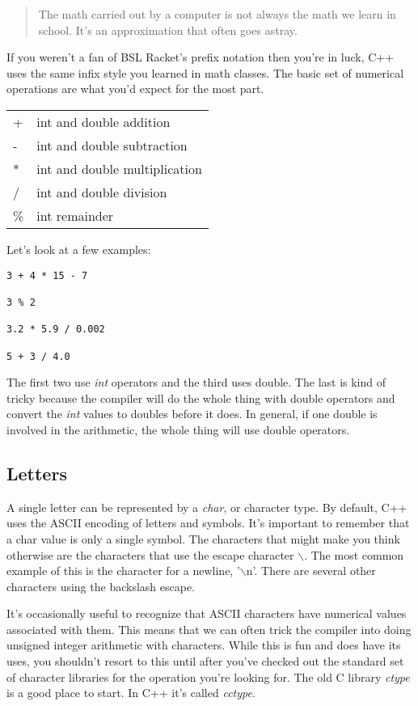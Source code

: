 \documentclass[]{tufte-handout}
\begin{document}
\begin{quote}
The math carried out by a computer is not always the math we learn in school. It's an approximation that often goes astray.
\end{quote}

If you weren't a fan of BSL Racket's prefix notation then you're in luck, C++ uses the same infix style you learned in math classes.  The basic set of numerical operations are what you'd expect for the most part.
\begin{center}
\begin{tabular}{ll}
+ & int and double addition \\
- & int and double subtraction \\
* & int and double multiplication \\
/ & int and double division \\
\% & int remainder
\end{tabular}
\end{center}

Let's look at a few examples:
\begin{verbatim}
3 + 4 * 15 - 7

3 % 2

3.2 * 5.9 / 0.002

5 + 3 / 4.0 
\end{verbatim}
The first two use \textit{int} operators and the third uses double.  The last is kind of tricky because the compiler will do the whole thing with double operators and convert the \textit{int} values to doubles before it does.  In general, if one double is involved in the arithmetic, the whole thing will use double operators.

\subsection{Letters}

A single letter can be represented by a \textit{char}, or character type.  By default, C++ uses the ASCII encoding of letters and symbols. It's important to remember that a char value is only a single symbol.  The characters that might make you think otherwise are the characters that use the escape character $\backslash$.  The most common example of this is the character for a newline, '$\backslash$n'. There are several other characters using the backslash escape.  

It's occasionally useful to recognize that ASCII characters have numerical values associated with them. This means that we can often trick the compiler into doing unsigned integer arithmetic with characters.   While this is fun and does have its uses, you shouldn't resort to this until after you've checked out the standard set of character libraries for the operation you're looking for. The old C library \textit{ctype} is a good place to start. In C++ it's called \textit{cctype}. 
\end{document}
